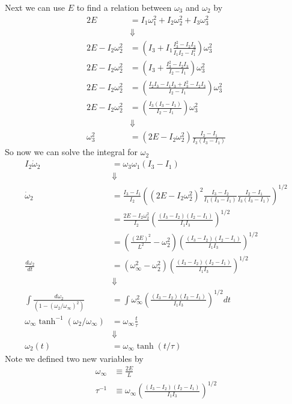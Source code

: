 \documentclass[11pt]{article}
\numberwithin{equation}{section}
\begin{document}
Next we can use $E$ to find a relation between $\omega_3$ and $\omega_2$ by
\begin{align*}
2E &= I_1\omega_1^2+I_2\omega_2^2+I_3\omega_3^2\\
&\Downarrow\\
2E - I_2\omega_2^2 &= \left(I_3+I_1\frac{I_3^2-I_2I_3}{I_1I_2-I_1^2}\right)\omega_3^2\\
2E - I_2\omega_2^2 &= \left(I_3+\frac{I_3^2-I_2I_3}{I_2-I_1}\right)\omega_3^2\\
2E - I_2\omega_2^2 &= \left(\frac{I_2I_3-I_1I_3+I_3^2-I_2I_3}{I_2-I_1}\right)\omega_3^2\\
2E - I_2\omega_2^2 &= \left(\frac{I_3(I_3-I_1)}{I_2-I_1}\right)\omega_3^2\\
&\Downarrow\\
\omega_3^2 &= (2E - I_2\omega_2^2)\frac{I_2-I_1}{I_3(I_3-I_1)}
\end{align*}
So now we can solve the integral for $\omega_2$ 
\begin{align*}
I_2\dot{\omega}_2 &= \omega_{3}\omega_{1}(I_3-I_1)\\
&\Downarrow\\
\dot{\omega}_2 &= \frac{I_3-I_1}{I_2}\left((2E - I_2\omega_2^2)^2\frac{I_3-I_2}{I_1(I_3-I_1)}\frac{I_2-I_1}{I_3(I_3-I_1)}\right)^{1/2}\\
&= \frac{2E-I_2\omega_2^2}{I_2}\left(\frac{(I_3-I_2)(I_2-I_1)}{I_1I_3}\right)^{1/2}\\
&= \left(\frac{(2E)^2}{L^2}-\omega_2^2\right)\left(\frac{(I_3-I_2)(I_2-I_1)}{I_1I_3}\right)^{1/2}\\
\frac{d\omega_2}{dt} &= (\omega_{\infty}^2-\omega_2^2)\left(\frac{(I_3-I_2)(I_2-I_1)}{I_1I_3}\right)^{1/2}\\
&\Downarrow\\
\int\frac{d\omega_2}{(1-(\omega_2/\omega_{\infty})^2)} &= \int\omega_{\infty}^2\left(\frac{(I_3-I_2)(I_2-I_1)}{I_1I_3}\right)^{1/2}dt\\
\omega_{\infty}\tanh^{-1}\left(\omega_2/\omega_{\infty}\right) &= \omega_{\infty}\frac{t}{\tau}\\
&\Downarrow\\
\omega_2(t) &= \omega_{\infty}\tanh(t/\tau)
\end{align*}
Note  we defined two new variables by
\begin{align*}
\omega_{\infty} &\equiv \frac{2E}{L}\\
\tau^{-1} &\equiv \omega_{\infty}\left(\frac{(I_3-I_2)(I_2-I_1)}{I_1I_3}\right)^{1/2}
\end{align*}
\end{document}
